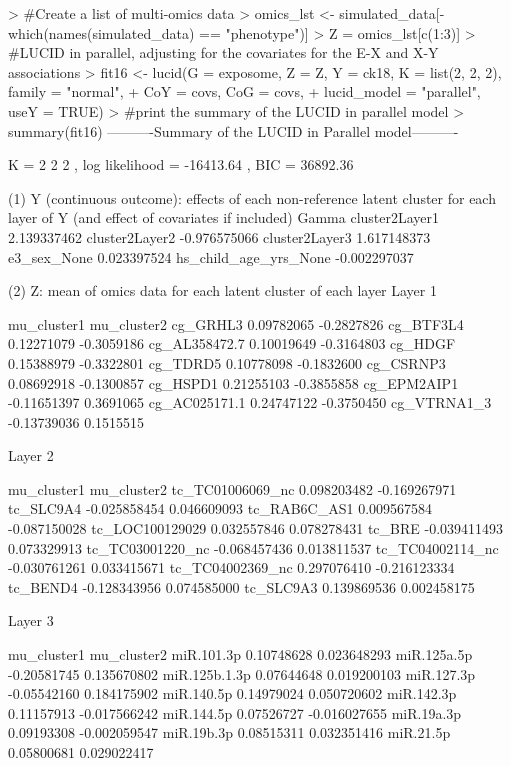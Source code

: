 \begin{example}
> #Create a list of multi-omics data
> omics_lst <- simulated_data[-which(names(simulated_data) == "phenotype")]
> Z = omics_lst[c(1:3)]  
> #LUCID in parallel, adjusting for the covariates for the E-X and X-Y associations
> fit16 <- lucid(G = exposome, Z = Z, Y = ck18, K = list(2, 2, 2), family = "normal", 
+                CoY = covs, CoG = covs,
+                lucid_model = "parallel", useY = TRUE)
> #print the summary of the LUCID in parallel model      
> summary(fit16)
----------Summary of the LUCID in Parallel model---------- 
 
K =  2 2 2 , log likelihood = -16413.64 , BIC =  36892.36 
 
(1) Y (continuous outcome): effects of each non-reference latent cluster 
    for each layer of Y 
(and effect of covariates if included) 
                             Gamma
cluster2Layer1         2.139337462
cluster2Layer2        -0.976575066
cluster2Layer3         1.617148373
e3_sex_None            0.023397524
hs_child_age_yrs_None -0.002297037

(2) Z: mean of omics data for each latent cluster of each layer 
Layer  1 
 
              mu_cluster1 mu_cluster2
cg_GRHL3       0.09782065  -0.2827826
cg_BTF3L4      0.12271079  -0.3059186
cg_AL358472.7  0.10019649  -0.3164803
cg_HDGF        0.15388979  -0.3322801
cg_TDRD5       0.10778098  -0.1832600
cg_CSRNP3      0.08692918  -0.1300857
cg_HSPD1       0.21255103  -0.3855858
cg_EPM2AIP1   -0.11651397   0.3691065
cg_AC025171.1  0.24747122  -0.3750450
cg_VTRNA1_3   -0.13739036   0.1515515

 
Layer  2 
 
                  mu_cluster1  mu_cluster2
tc_TC01006069_nc  0.098203482 -0.169267971
tc_SLC9A4        -0.025858454  0.046609093
tc_RAB6C_AS1      0.009567584 -0.087150028
tc_LOC100129029   0.032557846  0.078278431
tc_BRE           -0.039411493  0.073329913
tc_TC03001220_nc -0.068457436  0.013811537
tc_TC04002114_nc -0.030761261  0.033415671
tc_TC04002369_nc  0.297076410 -0.216123334
tc_BEND4         -0.128343956  0.074585000
tc_SLC9A3         0.139869536  0.002458175

 
Layer  3 
 
              mu_cluster1  mu_cluster2
miR.101.3p     0.10748628  0.023648293
miR.125a.5p   -0.20581745  0.135670802
miR.125b.1.3p  0.07644648  0.019200103
miR.127.3p    -0.05542160  0.184175902
miR.140.5p     0.14979024  0.050720602
miR.142.3p     0.11157913 -0.017566242
miR.144.5p     0.07526727 -0.016027655
miR.19a.3p     0.09193308 -0.002059547
miR.19b.3p     0.08515311  0.032351416
miR.21.5p      0.05800681  0.029022417


\end{example}
